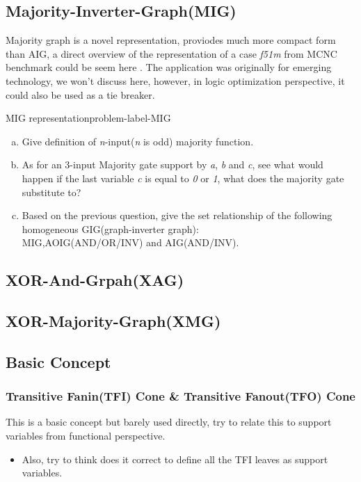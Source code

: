 \documentclass[main.tex]{subfiles}
\begin{document}
\subsection{Majority-Inverter-Graph(MIG)}
Majority graph is a novel representation, proviodes much more compact form than AIG, a direct overview of the representation of a case \textit{f51m} from MCNC benchmark could be seem here \cite{MIGOri}. The application was originally for emerging technology, we won't discuss here, however, in logic optimization perspective, it could also be used as a tie breaker. 
\begin{problem}{MIG representation}{problem-label-MIG}
\begin{enumerate}[(a)]
    \item Give definition of \textit{n}-input(\textit{n} is odd) majority function.
    \item As for an 3-input Majority gate support by \textit{a}, \textit{b} and  \textit{c}, see what would happen if the last variable \textit{c} is equal to \textit{0} or \textit{1}, what does the majority gate substitute to?
    \item Based on the previous question, give the set relationship of the following homogeneous GIG(graph-inverter graph):\\
    MIG,AOIG(AND/OR/INV) and AIG(AND/INV).
\end{enumerate}
\end{problem}
\vspace*{4\baselineskip}


\subsection{XOR-And-Grpah(XAG)}

\subsection{XOR-Majority-Graph(XMG)}

\subsection{Basic Concept}
\subsubsection{Transitive Fanin(TFI) Cone \& Transitive Fanout(TFO) Cone}
This is a basic concept but barely used directly, try to relate this to support variables from functional perspective.
\begin{itemize}
    \item Also, try to think does it correct to define all the TFI leaves as support variables.
\end{itemize}
\end{document}
